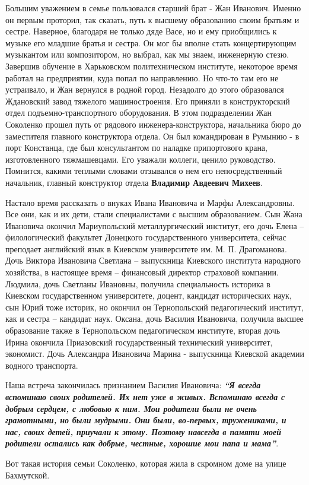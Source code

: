 Большим уважением в семье пользовался старший брат - Жан Иванович. Именно он
первым проторил, так сказать, путь к высшему образованию своим братьям и
сестре. Наверное, благодаря не только дяде Васе, но и ему приобщились к музыке
его младшие братья и сестра. Он мог бы вполне стать концертирующим музыкантом
или композитором, но выбрал, как мы знаем, инженерную стезю. Завершив обучение
в Харьковском политехническом институте, некоторое время работал на
предприятии, куда попал по направлению. Но что-то там его не устраивало, и Жан
вернулся в родной город. Незадолго до этого образовался Ждановский завод
тяжелого машиностроения. Его приняли в конструкторский отдел
подъемно-транспортного оборудования. В этом подразделении Жан Соколенко прошел
путь от рядового инженера-конструктора, начальника бюро до заместителя главного
конструктора отдела. Он был командирован в Румынию - в порт Констанца, где был
консультантом по наладке припортового крана, изготовленного тяжмашевцами. Его
уважали коллеги, ценило руководство. Помнится, какими теплыми словами отзывался
о нем его непосредственный начальник, главный конструктор отдела \textbf{Владимир
Авдеевич Михеев}.

Настало время рассказать о внуках Ивана Ивановича и Марфы Александровны. Все
они, как и их дети, стали специалистами с высшим образованием. Сын Жана
Ивановича окончил Мариупольский металлургический институт, его дочь Елена –
филологический факультет Донецкого государственного университета, сейчас
преподает английский язык в Киевском университете им. М. П. Драгоманова. Дочь
Виктора Ивановича Светлана – выпускница Киевского института народного
хозяйства, в настоящее время – финансовый директор страховой компании.
Людмила, дочь Светланы Ивановны, получила специальность историка в Киевском
государственном университете, доцент, кандидат исторических наук, сын Юрий тоже
историк, но окончил он Тернопольский педагогический институт, как и сестра –
кандидат наук. Оксана, дочь Василия Ивановича, получила высшее образование
также в Тернопольском педагогическом институте, вторая дочь Ирина окончила
Приазовский государственный технический университет, экономист. Дочь Александра
Ивановича Марина - выпускница Киевской академии водного транспорта.

Наша встреча закончилась признанием Василия Ивановича: {\em\bfseries\enquote{Я всегда вспоминаю
своих родителей. Их нет уже в живых. Вспоминаю всегда с добрым сердцем, с
любовью к ним. Мои родители были не очень грамотными, но были мудрыми. Они
были, во-первых, тружениками, и нас, своих детей, приучали к этому. Поэтому
навсегда в памяти моей родители остались как добрые, честные, хорошие мои папа
и мама}}.

Вот такая история семьи Соколенко, которая жила в скромном доме на улице
Бахмутской.
